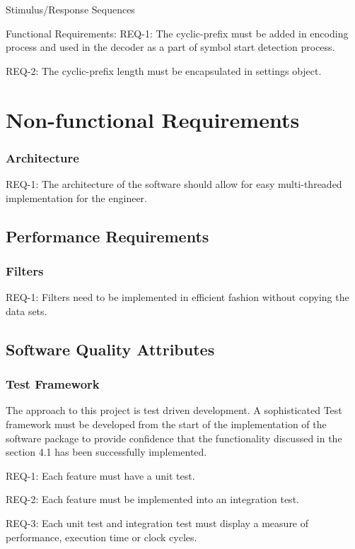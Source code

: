 \documentclass[]{report}
\begin{document}
Stimulus/Response Sequences \par

Functional Requirements:
REQ-1: The cyclic-prefix must be added in encoding process and used in the decoder as a part of symbol start detection process. \par 
REQ-2: The cyclic-prefix length must be encapsulated in settings object. \par

\pagebreak
\section{Non-functional Requirements}

\subsubsection{Architecture}

REQ-1: The architecture of the software should allow for easy multi-threaded implementation for the engineer. \par

\subsection{Performance Requirements}


\subsubsection{Filters}

REQ-1: Filters need to be implemented in efficient fashion without copying the data sets. \par


\subsection{Software Quality Attributes}



\subsubsection{Test Framework}

The approach to this project is test driven development. A sophisticated Test framework must be developed from the start of the implementation of the software package to provide confidence that the functionality discussed in the section 4.1 has been successfully implemented.

REQ-1: Each feature must have a unit test. \par
REQ-2: Each feature must be implemented into an integration test. \par 
REQ-3: Each unit test and integration test must display a measure of performance, execution time or clock cycles. \par


\pagebreak
\end{document}
